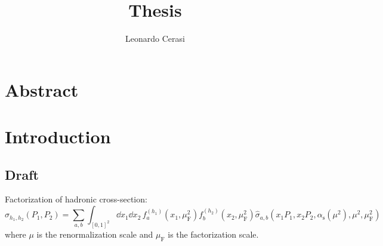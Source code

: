 \documentclass[a4paper, 12pt]{book}
\title{Thesis}
\author{Leonardo Cerasi}
\newcommand{\ren}{\mu}
\newcommand{\fac}{\mu_\text{F}}
\newcommand{\rc}{\alpha_\text{s}}
\newcommand{\pcs}{\hat{\sigma}}
\newcommand{\hcs}{\sigma}
\begin{document}
\frontmatter

\clearpage

\chapter*{Abstract}


\newpage

\toc

\pagestyle{contents}

\mainmatter

\chapter{Introduction}

\section{Draft}

Factorization of hadronic cross-section:
\begin{equation*}
  \hcs_{h_1 , h_2}(P_1 , P_2) = \sum_{a,b} \int_{[0,1]^2} \dd x_1 \dd x_2 \, f_a^{(h_1)}(x_1, \fac^2) f_b^{(h_2)}(x_2, \fac^2) \pcs_{a,b}(x_1 P_1, x_2 P_2, \rc(\ren^2), \ren^2, \fac^2)
\end{equation*}
where $ \ren $ is the renormalization scale and $ \fac $ is the factorization scale.
\end{document}
